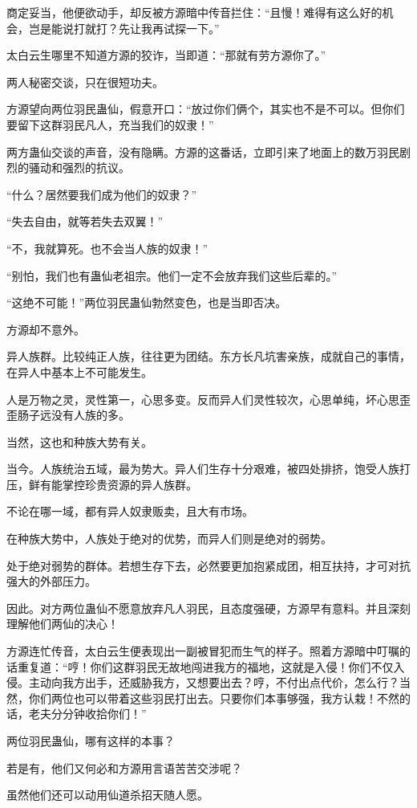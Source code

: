 \begin{this_body}
商定妥当，他便欲动手，却反被方源暗中传音拦住：“且慢！难得有这么好的机会，岂是能说打就打？先让我再试探一下。”

太白云生哪里不知道方源的狡诈，当即道：“那就有劳方源你了。”

两人秘密交谈，只在很短功夫。

方源望向两位羽民蛊仙，假意开口：“放过你们俩个，其实也不是不可以。但你们要留下这群羽民凡人，充当我们的奴隶！”

两方蛊仙交谈的声音，没有隐瞒。方源的这番话，立即引来了地面上的数万羽民剧烈的骚动和强烈的抗议。

“什么？居然要我们成为他们的奴隶？”

“失去自由，就等若失去双翼！”

“不，我就算死。也不会当人族的奴隶！”

“别怕，我们也有蛊仙老祖宗。他们一定不会放弃我们这些后辈的。”

“这绝不可能！”两位羽民蛊仙勃然变色，也是当即否决。

方源却不意外。

异人族群。比较纯正人族，往往更为团结。东方长凡坑害亲族，成就自己的事情，在异人中基本上不可能发生。

人是万物之灵，灵性第一，心思多变。反而异人们灵性较次，心思单纯，坏心思歪歪肠子远没有人族的多。

当然，这也和种族大势有关。

当今。人族统治五域，最为势大。异人们生存十分艰难，被四处排挤，饱受人族打压，鲜有能掌控珍贵资源的异人族群。

不论在哪一域，都有异人奴隶贩卖，且大有市场。

在种族大势中，人族处于绝对的优势，而异人们则是绝对的弱势。

处于绝对弱势的群体。若想生存下去，必然要更加抱紧成团，相互扶持，才可对抗强大的外部压力。

因此。对方两位蛊仙不愿意放弃凡人羽民，且态度强硬，方源早有意料。并且深刻理解他们两仙的决心！

方源连忙传音，太白云生便表现出一副被冒犯而生气的样子。照着方源暗中叮嘱的话重复道：“哼！你们这群羽民无故地闯进我方的福地，这就是入侵！你们不仅入侵。主动向我方出手，还威胁我方，又想要出去？哼，不付出点代价，怎么行？当然，你们两位也可以带着这些羽民打出去。只要你们本事够强，我方认栽！不然的话，老夫分分钟收拾你们！”

两位羽民蛊仙，哪有这样的本事？

若是有，他们又何必和方源用言语苦苦交涉呢？

虽然他们还可以动用仙道杀招天随人愿。


\end{this_body}
